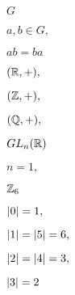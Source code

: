 \documentclass[10pt]{book}
\begin{document}
\begin{mdSnippets}
\begin{mdInlineSnippet}[dfcf28d0734569a6a693bc8194de62bf]%
$G$\end{mdInlineSnippet}%
\begin{mdInlineSnippet}[ad968592e3940ccacb51f0194bf8da86]%
$a,b \in G,$\end{mdInlineSnippet}%
\begin{mdInlineSnippet}[98f640cc29d620bb9d18c2b87b327bb3]%
$ab = ba$\end{mdInlineSnippet}%
\begin{mdInlineSnippet}%
$(\mathbb{R}, +),$\end{mdInlineSnippet}%
\begin{mdInlineSnippet}[7a27e59e9ae9897e5d37a19d16b9d08d]%
$(\mathbb{Z}, +),$\end{mdInlineSnippet}%
\begin{mdInlineSnippet}[50588801353ea53bcc17e32fb2be9139]%
$(\mathbb{Q}, +),$\end{mdInlineSnippet}%
\begin{mdInlineSnippet}[16f20e52f211dc23b3ecfc45e052cf72]%
$GL_n(\mathbb{R})$\end{mdInlineSnippet}%
\begin{mdInlineSnippet}[0ab55a10a44a3f243d05b5d6a7a9a3fb]%
$n=1,$\end{mdInlineSnippet}%
\begin{mdInlineSnippet}[edc9e1038014d2f573835f2ac9de372a]%
$\mathbb{Z}_6$\end{mdInlineSnippet}%
\begin{mdInlineSnippet}[23e4780a54c784da2094cd93a863eaa6]%
$\left\vert 0\right\vert = 1,$\end{mdInlineSnippet}%
\begin{mdInlineSnippet}[4bf75ad85501bf5848e8ff096d070210]%
$\left\vert 1\right\vert = \left\vert 5\right\vert = 6,$\end{mdInlineSnippet}%
\begin{mdInlineSnippet}%
$\left\vert 2\right\vert = \left\vert 4\right\vert = 3,$\end{mdInlineSnippet}%
\begin{mdInlineSnippet}[ba81442e7ee331a5c947c25184636ad5]%
$\left\vert 3\right\vert = 2$\end{mdInlineSnippet}%

\end{mdSnippets}
\end{document}
